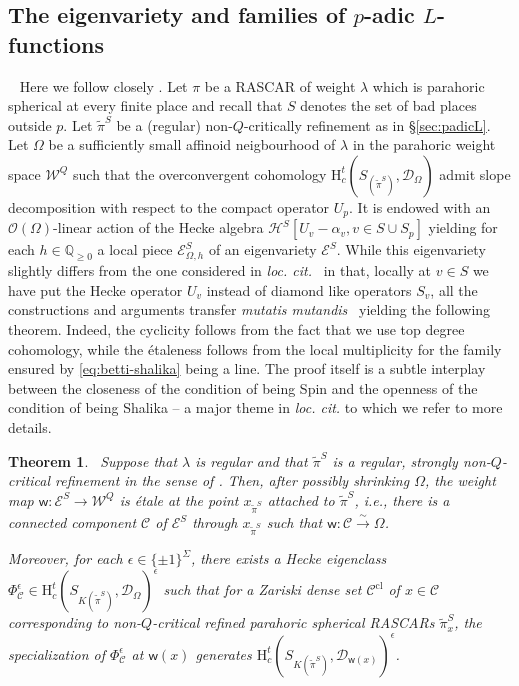 \documentclass{amsart}
\newtheorem{theorem}[thm]{Theorem}
\theoremstyle{definition}
\newcommand{\Q}{\mathbb{Q}}
\newcommand{\cH}{\mathcal{H}}
\begin{document}
{\subsection{The eigenvariety and families of $p$-adic $L$-functions}~
Here we follow closely \cite[\S8.3]{BDW}. 
Let $\pi$ be a RASCAR of weight $\lambda$  which is parahoric spherical at every finite place and recall that $S$ denotes the set of bad places outside $p$. 
Let $\widetilde\pi^S$ be a (regular) non-$Q$-critically refinement as in \S\ref{sec:padicL}.  
Let $\Omega$ be a sufficiently small affinoid neigbourhood of $\lambda$ in the parahoric weight space $\mathcal{W}^Q$ such that 
the overconvergent cohomology $\mathrm{H}_c^t(S_{(\widetilde\pi^S)},\mathcal{D}_\Omega)$ admit slope decomposition with respect to the compact operator 
$U_p$. It is endowed with an $\mathcal{O}(\Omega)$-linear  action of the Hecke algebra $\cH^S[U_v - \alpha_v, v\in S\cup S_p]$ yielding for each $h\in \Q_{\geqslant 0}$ a local piece $\mathcal{E}^S_{\Omega,h}$ of an eigenvariety $\mathcal{E}^S$. While this eigenvariety slightly differs from the one considered in 
{\it loc. cit. }~in that, locally at $v\in S$ we have put the Hecke operator $U_v$  instead of diamond like operators $S_v$, all the constructions and arguments transfer {\it mutatis mutandis }~yielding the following theorem. Indeed, the cyclicity  follows from the fact that we use top degree cohomology, while the \'etaleness follows from the local multiplicity for the family  ensured by \eqref{eq:betti-shalika} being a line. The proof itself is a subtle interplay between the closeness of the condition of being Spin and the openness of the condition of being Shalika --  a major theme in  {\it loc. cit. } to which we refer to more details. 

\begin{theorem}~\label{t:eigenvariety}
Suppose that $\lambda$ is regular and that $\tilde\pi^S$ is a regular,  strongly non-$Q$-critical refinement in the sense of \cite[Def.~3.14]{BDW}. 
	 Then, after possibly shrinking $\Omega$, 
	the weight map $\mathsf{w}:\mathcal{E}^S\to \mathcal{W}^Q$ is \'etale at the point 	$x_{\tilde\pi^S}$ attached to $\tilde\pi^S$, i.e.,  
there is a 	 connected component $\mathcal{C}$  of $\mathcal{E}^S$ through $x_{\tilde\pi^S}$ such  that $\mathsf{w}:\mathcal{C}\xrightarrow{\sim} \Omega$. 
	
Moreover, for each $\epsilon \in \{\pm1\}^\Sigma$, there exists a Hecke eigenclass $\Phi_{\mathcal{C}}^\epsilon \in 
\mathrm{H}_c^t(S_{K(\widetilde\pi^S)},\mathcal{D}_\Omega)^{\epsilon}$ such that for a  Zariski dense set $\mathcal{C}^{\mathrm{cl}}$  of $x\in \mathcal{C}$  corresponding to non-$Q$-critical refined parahoric spherical RASCARs $\tilde\pi_x^S$,  the specialization of $\Phi_{\mathcal{C}}^\epsilon$ at $\mathsf{w}(x)$ generates 
 $\mathrm{H}_c^t(S_{K(\widetilde\pi^S)},\mathcal{D}_{\mathsf{w}(x)})^{\epsilon}$. 
 \end{theorem}~
 
}
\end{document}
